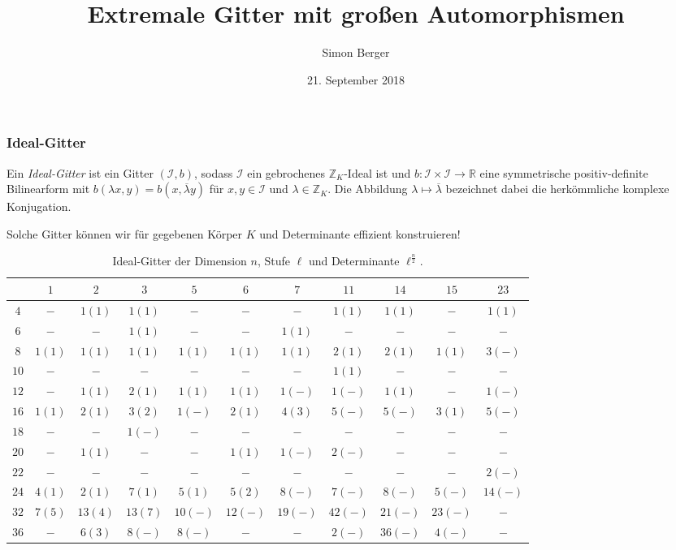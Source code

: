 \documentclass{beamer}
\title{Extremale Gitter mit großen Automorphismen}
\author{Simon Berger}
\date{21. September 2018}
\newcommand{\Z}{\mathbb{Z}}
\newcommand{\R}{\mathbb{R}}
\newcommand{\I}{\mathcal{I}}
\begin{document}
\begin{frame}[plain]
	\titlepage
\end{frame}

\begin{frame}[plain]
	\frametitle{Ideal-Gitter}
	\begin{Definition}
			Ein \textit{Ideal-Gitter} ist ein Gitter $(\I,b)$, sodass $\I$ ein gebrochenes $\Z_K$-Ideal ist und $b:\I \times \I \rightarrow \R$ eine symmetrische positiv-definite Bilinearform mit $b(\lambda x, y) = b(x, \overline{\lambda} y)$ für $x,y \in \I$ und $\lambda \in \Z_K$. Die Abbildung $\lambda \mapsto \overline{\lambda}$ bezeichnet dabei die herkömmliche komplexe Konjugation.
	\end{Definition}
	\pause
	Solche Gitter können wir für gegebenen Körper $K$ und Determinante effizient konstruieren!
\end{frame}

\begin{frame}[plain]
	\begin{tiny}
	\begin{table}
	\centering
	\begin{tabular}{|c||c|c|c|c|c|c|c|c|c|c|}
		\hline
		\backslashbox{$n$}{$\ell$}	&$1$	&$2$	&$3$	&$5$	&$6$	&$7$	&$11$	&$14$	&$15$	&$23$\\ \hline \hline
		$4$		&$-$		&$1(1)$		&$1(1)$		&$-$		&$-$		&$-$		&$1(1)$		&$1(1)$		&$-$		&$1(1)$ \\ \hline
		$6$		&$-$		&$-$		&$1(1)$		&$-$		&$-$		&$1(1)$		&$-$		&$-$		&$-$		&$-$ \\ \hline
		$8$		&$1(1)$		&$1(1)$		&$1(1)$		&$1(1)$		&$1(1)$		&$1(1)$		&$2(1)$		&$2(1)$		&$1(1)$		&$3(-)$ \\ \hline
		$10$	&$-$		&$-$		&$-$		&$-$		&$-$		&$-$		&$1(1)$		&$-$		&$-$		&$-$ \\ \hline
		$12$	&$-$		&$1(1)$		&$2(1)$		&$1(1)$		&$1(1)$		&$1(-)$		&$1(-)$		&$1(1)$		&$-$		&$1(-)$ \\ \hline
		$16$	&$1(1)$		&$2(1)$		&$3(2)$		&$1(-)$		&$2(1)$		&$4(3)$		&$5(-)$		&$5(-)$		&$3(1)$		&$5(-)$ \\ \hline
		$18$	&$-$		&$-$		&$1(-)$		&$-$		&$-$		&$-$		&$-$		&$-$		&$-$		&$-$ \\ \hline
		$20$	&$-$		&$1(1)$		&$-$		&$-$		&$1(1)$		&$1(-)$		&$2(-)$		&$-$		&$-$		&$-$ \\ \hline
		$22$	&$-$		&$-$		&$-$		&$-$		&$-$		&$-$		&$-$		&$-$		&$-$		&$2(-)$ \\ \hline
		$24$	&$4(1)$		&$2(1)$		&$7(1)$		&$5(1)$		&$5(2)$		&$8(-)$		&$7(-)$		&$8(-)$		&$5(-)$		&$14(-)$ \\ \hline
		$32$	&$7(5)$		&$13(4)$	&$13(7)$	&$10(-)$	&$12(-)$	&$19(-)$	&$42(-)$	&$21(-)$	&$23(-)$	&$-$ \\ \hline
		$36$	&$-$		&$6(3)$		&$8(-)$		&$8(-)$		&$-$		&$-$		&$2(-)$		&$36(-)$	&$4(-)$		&$-$ \\ \hline
	\end{tabular}
	\caption{Ideal-Gitter der Dimension $n$, Stufe $\ell$ und Determinante $\ell^\frac{n}{2}$.}
	\end{table}
	\end{tiny}
\end{frame}
\end{document}
